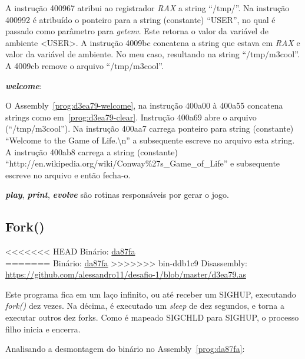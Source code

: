 A instrução 400967 atribui ao registrador \emph{RAX}
a string ``/tmp/''. Na instrução 400992 é atribuído o ponteiro para a
string (constante) ``USER'', no qual é passado como parâmetro para
\emph{getenv}. Este retorna o valor da variável de ambiente <USER>.
A instrução 4009bc concatena a string que estava em \emph{RAX} e valor da
variável de ambiente. No meu caso, resultando na string
``/tmp/m3cool''. A 4009cb remove o arquivo ``/tmp/m3cool''.\\

\par\textbf{\emph{welcome}}:


O Assembly~\ref{prog:d3ea79-welcome}, na instrução 400a00 à 400a55
concatena strings como em~\ref{prog:d3ea79-clear}. Instrução 400a69
abre o arquivo (``/tmp/m3cool''). Na instrução 400aa7 carrega ponteiro
para string (constante) ``Welcome to the Game of Life.\textbackslash n'' a
subsequente escreve no arquivo esta string. A instrução 400ab8 carrega a
string (constante) ``http://en.wikipedia.org/wiki/Conway\%27s\_Game\_of\_Life'' e
subsequente escreve no arquivo e então fecha-o.\\

\par\textbf{\emph{play}}, \textbf{\emph{print}},
\textbf{\emph{evolve}} são rotinas responsáveis por gerar o jogo.


\subsection{Fork()}
<<<<<<< HEAD
\noindent Binário: \href{https://s3.amazonaws.com/chaordic-desafio-cloud/da87fa}{da87fa}\\
=======
Binário: \href{https://s3.amazonaws.com/chaordic-desafio-cloud/da87fa}{da87fa}
>>>>>>> bin-ddb1c9
Disassembly:
\href{https://github.com/alessandro11/desafio-1/blob/master/d3ea79.as}{https://github.com/alessandro11/desafio-1/blob/master/d3ea79.as}

Este programa fica em um laço infinito, ou até receber um SIGHUP,
executando \emph{fork()} dez vezes. Na décima, é executado um
\emph{sleep} de dez segundos, e torna a executar outros dez
forks. Como é mapeado SIGCHLD para SIGHUP, o processo filho inicia e
encerra.

Analisando a desmontagem do binário no Assembly~\ref{prog:da87fa}:



